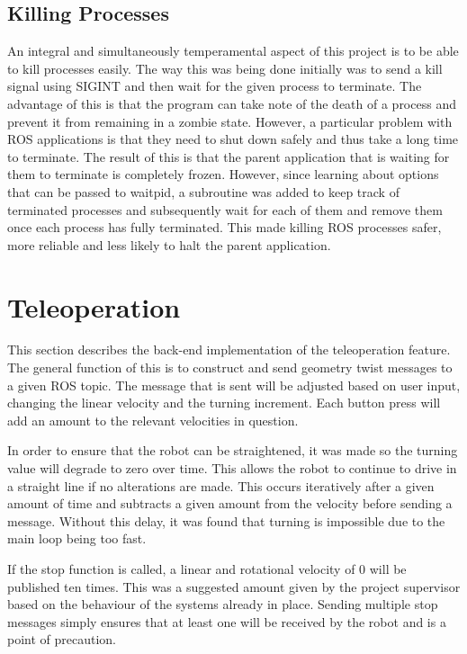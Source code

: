 \subsection{Killing Processes}
\label{killing}

An integral and simultaneously temperamental aspect of this project is to be able to kill processes easily. The way this was being done initially was to send a kill signal using {\selectfont SIGINT} and then wait for the given process to terminate. The advantage of this is that the program can take note of the death of a process and prevent it from remaining in a zombie state. However, a particular problem with {\selectfont ROS} applications is that they need to shut down safely and thus take a long time to terminate. The result of this is that the parent application that is waiting for them to terminate is completely frozen. However, since learning about options that can be passed to {\selectfont waitpid}, a subroutine was added to keep track of terminated processes and subsequently wait for each of them and remove them once each process has fully terminated. This made killing {\selectfont ROS} processes safer, more reliable and less likely to halt the parent application.

\section{Teleoperation}
\label{teleop}

This section describes the back-end implementation of the teleoperation feature. The general function of this is to construct and send geometry twist messages to a given {\selectfont ROS} topic. The message that is sent will be adjusted based on user input, changing the linear velocity and the turning increment. Each button press will add an amount to the relevant velocities in question.

In order to ensure that the robot can be straightened, it was made so the turning value will degrade to zero over time. This allows the robot to continue to drive in a straight line if no alterations are made. This occurs iteratively after a given amount of time and subtracts a given amount from the velocity before sending a message. Without this delay, it was found that turning is impossible due to the main loop being too fast.

If the stop function is called, a linear and rotational velocity of 0 will be published ten times. This was a suggested amount given by the project supervisor based on the behaviour of the systems already in place. Sending multiple stop messages simply ensures that at least one will be received by the robot and is a point of precaution.

